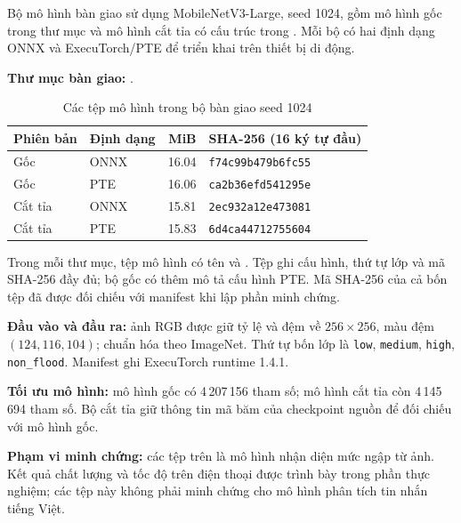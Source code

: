 \documentclass{template/ctu-report}
\begin{document}
\pagestyle{empty}
\thispagestyle{empty}
Bộ mô hình bàn giao sử dụng MobileNetV3-Large, seed 1024, gồm mô hình gốc trong thư mục  và mô hình cắt tỉa có cấu trúc trong . Mỗi bộ có hai định dạng ONNX và ExecuTorch/PTE để triển khai trên thiết bị di động.

\noindent\textbf{Thư mục bàn giao:} .

\begin{table}[htbp]\centering\small
\caption{Các tệp mô hình trong bộ bàn giao seed 1024}
\begin{tabular}{llrP{.35\textwidth}}
\toprule Phiên bản & Định dạng & MiB & SHA-256 (16 ký tự đầu) \\\midrule
Gốc & ONNX & 16.04 & \texttt{f74c99b479b6fc55} \\
Gốc & PTE & 16.06 & \texttt{ca2b36efd541295e} \\
Cắt tỉa & ONNX & 15.81 & \texttt{2ec932a12e473081} \\
Cắt tỉa & PTE & 15.83 & \texttt{6d4ca44712755604} \\
\bottomrule
\end{tabular}
\end{table}

Trong mỗi thư mục, tệp mô hình có tên  và . Tệp  ghi cấu hình, thứ tự lớp và mã SHA-256 đầy đủ; bộ gốc có thêm  mô tả cấu hình PTE. Mã SHA-256 của cả bốn tệp đã được đối chiếu với manifest khi lập phần minh chứng.

\noindent\textbf{Đầu vào và đầu ra:} ảnh RGB được giữ tỷ lệ và đệm về $256\times256$, màu đệm $(124,116,104)$; chuẩn hóa theo ImageNet. Thứ tự bốn lớp là \texttt{low}, \texttt{medium}, \texttt{high}, \texttt{non\_flood}. Manifest ghi ExecuTorch runtime 1.4.1.

\noindent\textbf{Tối ưu mô hình:} mô hình gốc có 4\,207\,156 tham số; mô hình cắt tỉa còn 4\,145\,694 tham số. Bộ cắt tỉa giữ thông tin mã băm của checkpoint nguồn để đối chiếu với mô hình gốc.

\noindent\textbf{Phạm vi minh chứng:} các tệp trên là mô hình nhận diện mức ngập từ ảnh. Kết quả chất lượng và tốc độ trên điện thoại được trình bày trong phần thực nghiệm; các tệp này không phải minh chứng cho mô hình phân tích tin nhắn tiếng Việt.
\end{document}

